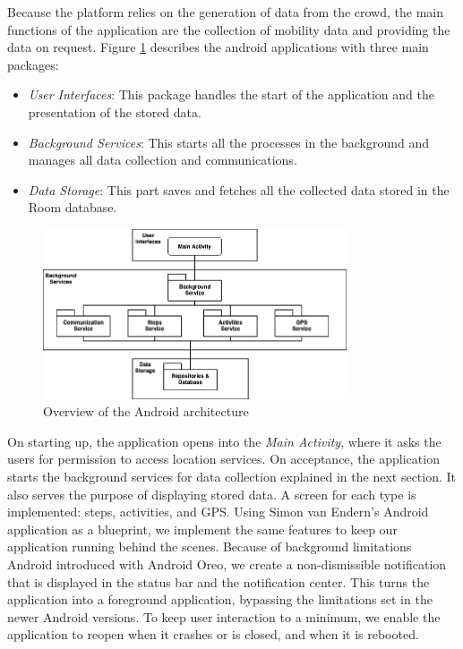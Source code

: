 Because the platform relies on the generation of data from the crowd, the main functions of the application are the collection of mobility data and providing the data on request. Figure \ref{fig:modules} describes the android applications with three main packages:

\begin{itemize}
    \item \textit{User Interfaces}: This package handles the start of the application and the presentation of the stored data.
    \item \textit{Background Services}: This starts all the processes in the background and manages all data collection and communications.
    \item \textit{Data Storage}: This part saves and fetches all the collected data stored in the Room database.
\end{itemize}

\begin{figure}[htpb]
  \centering
  \includegraphics[width=0.8\textwidth]{figures/modules}
  \caption{Overview of the Android architecture} \label{fig:modules}
\end{figure}

On starting up, the application opens into the \textit{Main Activity}, where it asks the users for permission to access location services. On acceptance, the application starts the background services for data collection explained in the next section. It also serves the purpose of displaying stored data. A screen for each type is implemented: steps, activities, and GPS. Using Simon van Endern's Android application as a blueprint, we implement the same features to keep our application running behind the scenes. Because of background limitations Android introduced with Android Oreo, we create a non-dismissible notification that is displayed in the status bar and the notification center. This turns the application into a foreground application, bypassing the limitations set in the newer Android versions. To keep user interaction to a minimum, we enable the application to reopen when it crashes or is closed, and when it is rebooted.

